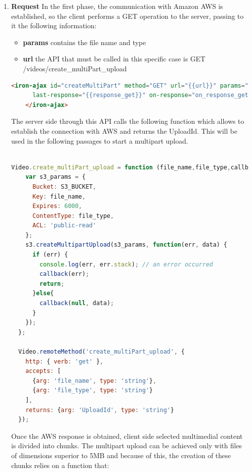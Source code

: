 \begin{enumerate}
\item \textbf{Request}
In the first phase, the communication with Amazon AWS is established, so the client performs a GET operation to the server, passing to it the following information:

   \begin{itemize}
      \item \textbf{params} contains the file name and type
      \item \textbf{url} the API that must be called in this specific case is GET /videos/create\_multiPart\_upload
    \end{itemize}

  \begin{lstlisting}[language=html]
    <iron-ajax id="createMultiPart" method="GET" url="{{url}}" params="{{params}}"
      last-response="{{response_get}}" on-response="on_response_get">
    </iron-ajax>
\end{lstlisting}

The server side through this API calls the following function which allows to establish the connection with AWS and returns the UploadId.
This will be used in the following passages to start a multipart upload.

\begin{lstlisting}[language=javascript]

Video.create_multiPart_upload = function (file_name,file_type,callback){
    var s3_params = {
      Bucket: S3_BUCKET,
      Key: file_name,
      Expires: 6000,
      ContentType: file_type,
      ACL: 'public-read'      
    };
    s3.createMultipartUpload(s3_params, function(err, data) {
      if (err) {
        console.log(err, err.stack); // an error occurred
        callback(err);
        return;
      }else{
        callback(null, data);
      }
    });
  };
  
  Video.remoteMethod('create_multiPart_upload', {
    http: { verb: 'get' },
    accepts: [
      {arg: 'file_name', type: 'string'},
      {arg: 'file_type', type: 'string'}
    ],
    returns: {arg: 'UploadId', type: 'string'}
  });

\end{lstlisting}

Once the AWS response is obtained, client side selected multimedial content is divided into chunks.
The multipart upload can be achieved only with files of dimensions superior to 5MB and because of this, the creation of these chunks relies on a function that:


\end{enumerate}
